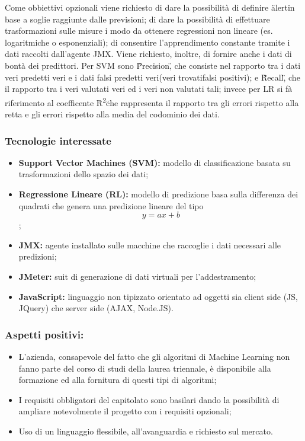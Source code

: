 			Come obbiettivi opzionali viene richiesto di dare la possibilità di definire \"alert\" in base a soglie raggiunte dalle previsioni; di dare la possibilità di effettuare trasformazioni sulle misure i modo da ottenere regressioni non lineare (es. logaritmiche o esponenziali); di consentire l'apprendimento constante tramite i dati raccolti dall'agente JMX. Viene richiesto, inoltre,  di fornire anche i dati di bontà dei predittori. Per SVM sono \"Precision\", che consiste nel rapporto tra i dati veri predetti veri e i dati falsi predetti veri(veri trovati\/falsi positivi); e \"Recall\", che il rapporto tra i veri valutati veri ed i veri non valutati tali; invece per LR si fà riferimento al coefficente \"R\textsuperscript{2}\" che rappresenta il rapporto tra gli errori rispetto alla retta e gli errori rispetto alla media del codominio dei dati.


		\subsubsection{Tecnologie interessate}
			\begin{itemize}
			  \item \textbf{Support Vector Machines (SVM):} modello di classificazione basata su trasformazioni dello spazio dei dati;
			  \item \textbf{Regressione Lineare (RL):} modello di predizione basa sulla differenza dei quadrati che genera una predizione lineare del tipo \[y=ax+b\];
				\item \textbf{JMX:} agente installato sulle macchine che raccoglie i dati necessari alle predizioni;
				\item \textbf{JMeter:} suit di generazione di dati virtuali per l'addestramento;
			  \item \textbf{JavaScript:} linguaggio non tipizzato orientato ad oggetti sia client side (JS, JQuery) che server side (AJAX, Node.JS).
			\end{itemize}

		\subsubsection{Aspetti positivi:}
			\begin{itemize}
			  \item L’azienda, consapevole del fatto che gli algoritmi di Machine Learning non fanno parte del corso di studi della laurea triennale, è disponibile alla formazione ed alla fornitura di questi tipi di algoritmi;
			  \item I requisiti obbligatori del capitolato sono basilari dando la possibilità di ampliare notevolmente il progetto con i requisiti opzionali;
			  \item Uso di un linguaggio flessibile, all'avanguardia e richiesto sul mercato.
			\end{itemize}

